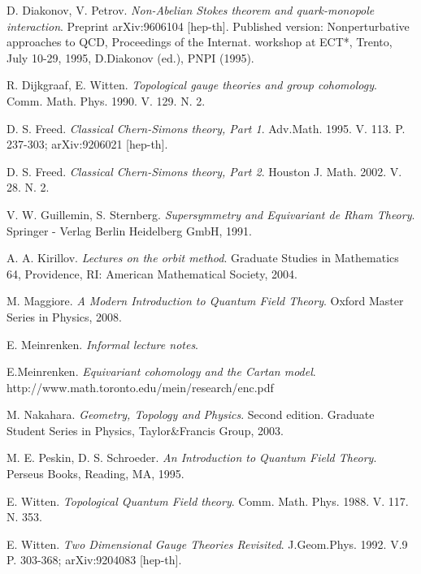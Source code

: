 \documentclass[11pt]{report}
\theoremstyle{plain}
\theoremstyle{definition}
\theoremstyle{remark}
\theoremstyle{remark}
\numberwithin{equation}{section}
\begin{document}
\begin{thebibliography}{99}
 D. Diakonov, V. Petrov. 
\textit{Non-Abelian Stokes theorem and quark-monopole interaction}. 
Preprint arXiv:9606104 [hep-th].
Published version: Nonperturbative approaches to QCD, Proceedings of the Internat. workshop at ECT*, Trento, July 10-29, 1995, D.Diakonov (ed.), PNPI (1995).

 R. Dijkgraaf, E. Witten. 
\textit{Topological gauge theories and group cohomology}. 
Comm. Math. Phys. 1990. V. 129. N. 2.

 D. S. Freed. 
\textit{Classical Chern-Simons theory, Part 1}.  
Adv.Math. 1995. V. 113. P. 237-303; arXiv:9206021 [hep-th].

 D. S. Freed. 
\textit{Classical Chern-Simons theory, Part 2}. 
Houston J. Math. 2002. V. 28. N. 2.


 V. W. Guillemin, S. Sternberg. 
\textit{Supersymmetry and Equivariant de Rham Theory}. 
Springer - Verlag Berlin Heidelberg GmbH, 1991.

 A. A. Kirillov. 
\textit{Lectures on the orbit method}. 
Graduate Studies in Mathematics 64, Providence, RI: American Mathematical Society, 2004.

 M. Maggiore. 
\textit{A Modern Introduction to Quantum Field Theory}. 
Oxford Master Series in Physics, 2008.

 E. Meinrenken. 
\textit{Informal lecture notes}.

 E.Meinrenken. 
\textit{Equivariant cohomology and the Cartan model}.
http://www.math.toronto.edu/mein/research/enc.pdf 
 

 M. Nakahara. 
\textit{Geometry, Topology and Physics}. Second edition. 
Graduate Student Series in Physics, Taylor\&Francis Group, 2003.

 M. E. Peskin, D. S. Schroeder. 
\textit{An Introduction to Quantum Field Theory}. 
Perseus Books, Reading, MA, 1995.

 E. Witten. 
\textit{Topological Quantum Field theory}. 
Comm. Math. Phys. 1988. V. 117. N. 353.

 E. Witten. 
\textit{Two Dimensional Gauge Theories Revisited}. 
J.Geom.Phys. 1992. V.9 P. 303-368; arXiv:9204083 [hep-th].


\end{thebibliography}
\end{document}
